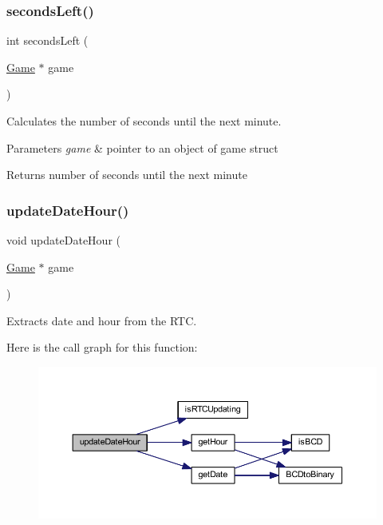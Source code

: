 \subsubsection{\texorpdfstring{seconds\+Left()}{secondsLeft()}}
{\footnotesize\ttfamily int seconds\+Left (\begin{DoxyParamCaption}\item[{\hyperlink{struct_game}{Game} $\ast$}]{game }\end{DoxyParamCaption})}



Calculates the number of seconds until the next minute. 


\begin{DoxyParams}{Parameters}
{\em game} & pointer to an object of game struct \\
\hline
\end{DoxyParams}
\begin{DoxyReturn}{Returns}
number of seconds until the next minute 
\end{DoxyReturn}
\mbox{\label{group___graphics_gacffa4b2e3dcebc554a5c24dec748eb04}} 
\subsubsection{\texorpdfstring{update\+Date\+Hour()}{updateDateHour()}}
{\footnotesize\ttfamily void update\+Date\+Hour (\begin{DoxyParamCaption}\item[{\hyperlink{struct_game}{Game} $\ast$}]{game }\end{DoxyParamCaption})}



Extracts date and hour from the R\+TC. 

Here is the call graph for this function\+:
\nopagebreak
\begin{figure}[H]
\begin{center}
\leavevmode
\includegraphics[width=350pt]{group___graphics_gacffa4b2e3dcebc554a5c24dec748eb04_cgraph}
\end{center}
\end{figure}
\mbox{\label{group___graphics_gae5f0e30e1262615f852a85d4db3c8261}} 

